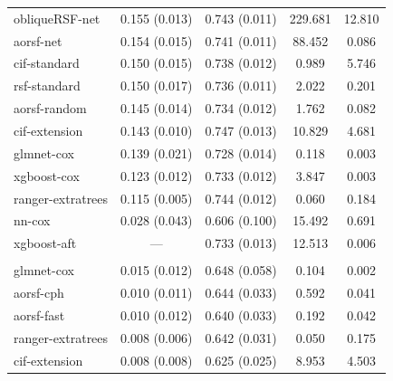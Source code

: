 \documentclass[twoside,11pt]{article}\usepackage[]{graphicx}\usepackage[]{xcolor}
\newenvironment{knitrout}{}{} %
\begin{document}
\begin{knitrout}
\begin{longtable}[t]{lcccc}
\hspace{1em}obliqueRSF-net & 0.155 (0.013) & 0.743 (0.011) & 229.681 & 12.810\\
\hspace{1em}aorsf-net & 0.154 (0.015) & 0.741 (0.011) & 88.452 & 0.086\\
\hspace{1em}cif-standard & 0.150 (0.015) & 0.738 (0.012) & 0.989 & 5.746\\
\hspace{1em}rsf-standard & 0.150 (0.017) & 0.736 (0.011) & 2.022 & 0.201\\
\hspace{1em}aorsf-random & 0.145 (0.014) & 0.734 (0.012) & 1.762 & 0.082\\
\hspace{1em}cif-extension & 0.143 (0.010) & 0.747 (0.013) & 10.829 & 4.681\\
\hspace{1em}glmnet-cox & 0.139 (0.021) & 0.728 (0.014) & 0.118 & 0.003\\
\hspace{1em}xgboost-cox & 0.123 (0.012) & 0.733 (0.012) & 3.847 & 0.003\\
\hspace{1em}ranger-extratrees & 0.115 (0.005) & 0.744 (0.012) & 0.060 & 0.184\\
\hspace{1em}nn-cox & 0.028 (0.043) & 0.606 (0.100) & 15.492 & 0.691\\
\hspace{1em}xgboost-aft & --- & 0.733 (0.013) & 12.513 & 0.006\\
\addlinespace[0.3em]
\multicolumn{5}{l}{\textit{\textbf{Monoclonal gammopathy; malignancy, n = 1384, p = 8}}}\\
\hline
\hspace{1em}glmnet-cox & 0.015 (0.012) & 0.648 (0.058) & 0.104 & 0.002\\
\hspace{1em}aorsf-cph & 0.010 (0.011) & 0.644 (0.033) & 0.592 & 0.041\\
\hspace{1em}aorsf-fast & 0.010 (0.012) & 0.640 (0.033) & 0.192 & 0.042\\
\hspace{1em}ranger-extratrees & 0.008 (0.006) & 0.642 (0.031) & 0.050 & 0.175\\
\hspace{1em}cif-extension & 0.008 (0.008) & 0.625 (0.025) & 8.953 & 4.503\\

\end{longtable}
\end{knitrout}
\end{document}
